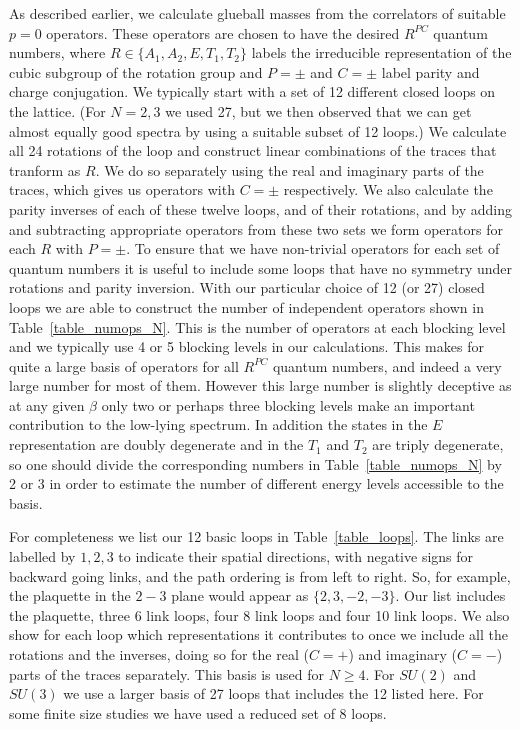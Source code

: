 \documentclass[12pt]{article}
\begin{document}
As described earlier, we calculate glueball masses from the correlators of suitable $p=0$ operators.
These operators are chosen to have the desired $R^{PC}$ quantum numbers, where
$R \in \{A_1,A_2,E,T_1,T_2\}$ labels the irreducible representation of the cubic subgroup of the
rotation group and $P=\pm$ and $C=\pm$ label parity and charge conjugation. We typically
start with a set of 12 different closed loops on the lattice. (For $N=2,3$ we used 27, but
we then observed that we can get almost equally good spectra by using a suitable subset of 12 loops.)
We calculate all 24 rotations of the loop and construct linear combinations of the traces that
tranform as $R$. We do so separately using the real and imaginary parts of the traces,
which gives us operators with $C=\pm$ respectively. We also calculate the parity inverses of
each of these twelve loops, and of their rotations, and by adding and subtracting appropriate
operators from these two sets we form operators for each $R$ with $P=\pm$. To ensure that
we have non-trivial operators for each set of quantum numbers it is useful to include
some loops that have no symmetry under rotations and parity inversion. With our particular
choice of 12 (or 27) closed loops we are able to construct the number of independent operators
shown in Table~\ref{table_numops_N}. This is the number of operators at each blocking level and 
we typically use 4 or 5 blocking levels in our calculations. This makes for quite a large 
basis of operators for all $R^{PC}$ quantum numbers, and indeed a very large number for most
of them. However this large number is slightly deceptive as at any given $\beta$ only two or perhaps
three blocking levels make an important contribution to the low-lying spectrum. In addition
the states in the $E$ representation are doubly degenerate and in the $T_1$ and $T_2$ are
triply degenerate, so one should divide the corresponding numbers in Table~\ref{table_numops_N}
by 2 or 3 in order to estimate the number of different energy levels accessible to
the basis.

For completeness we list our 12 basic loops in Table~\ref{table_loops}.
The links are labelled by $1,2,3$ to indicate their spatial directions, with
negative signs for backward going links, and the path ordering is from left to right.
So, for example, the plaquette in the $2-3$ plane would appear as $\{2,3,-2,-3\}$.
Our list includes the plaquette, three 6 link loops, four 8 link loops
and four 10 link loops.  We also show for each loop which representations
it contributes to once we include all the rotations and the inverses, doing so for the
real ($C=+$) and  imaginary ($C=-$) parts of the traces separately. This basis is
used for $N\geq 4$. For $SU(2)$ and $SU(3)$ we use a larger basis of 27 loops
that includes the 12 listed here. For some finite size studies we have used
a reduced set of 8 loops. 
\end{document}
